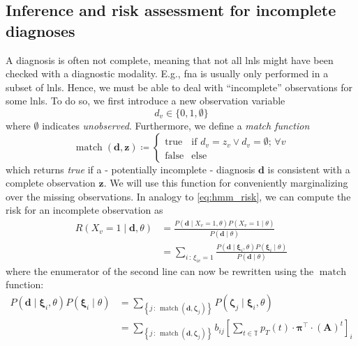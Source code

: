 \documentclass[../ms.tex]{subfiles}
\begin{document}
\subsection{Inference and risk assessment for incomplete diagnoses}
\label{subsec:hmm_incomplete_diag}

A diagnosis is often not complete, meaning that not all \glspl{lnl} might have been checked with a diagnostic modality. E.g., \gls{fna} is usually only performed in a subset of \glspl{lnl}. Hence, we must be able to deal with “incomplete” observations for some \glspl{lnl}. To do so, we first introduce a new observation variable
%
\begin{equation}
    d_v \in \{ 0, 1, \emptyset \}
\end{equation}
%
where $\emptyset$ indicates \emph{unobserved}. Furthermore, we define a \emph{match function}
%
\begin{equation}
    \operatorname{match}(\mathbf{d}, \mathbf{z}) \coloneqq 
    \begin{cases}
        \text{true} & \text{if} \,\, d_v = z_v \vee d_v = \emptyset ; \,\forall v \\
        \text{false} & \text{else}
    \end{cases}
\end{equation}
%
which returns \emph{true} if a - potentially incomplete - diagnosis $\mathbf{d}$ is consistent with a complete observation $\mathbf{z}$. We will use this function for conveniently marginalizing over the missing observations. In analogy to \cref{eq:hmm_risk}, we can compute the risk for an incomplete observation as
%
\begin{equation} \label{eq:hmm_marg_risk}
    \begin{aligned}
        R \left( X_v=1 \mid \mathbf{d}, \theta \right) 
        &= \frac{P \left( \mathbf{d} \mid X_v=1, \theta \right) P \left( X_v=1 \mid \theta \right)}{P \left( \mathbf{d} \mid \theta \right)} \\
        &= \sum_{i\,:\,\xi_{iv}=1}{\frac{P \left( \mathbf{d} \mid \boldsymbol{\xi}_i , \theta \right) P \left( \boldsymbol{\xi}_i \mid \theta \right)}{P \left( \mathbf{d} \mid \theta \right)}}
    \end{aligned}
\end{equation}
%
where the enumerator of the second line can now be rewritten using the $\operatorname{match}$ function:
%
\begin{equation}
    \begin{aligned}
        P \left( \mathbf{d} \mid \boldsymbol{\xi}_i , \theta \right) P \left( \boldsymbol{\xi}_i \mid \theta \right) 
        &= \sum_{\left\{ j \,:\, \operatorname{match}(\mathbf{d}, \boldsymbol{\zeta}_j) \right\}}{ P \left( \boldsymbol{\zeta}_j \mid \boldsymbol{\xi}_i , \theta \right)} \\
        &= \sum_{\left\{ j \,:\, \operatorname{match}(\mathbf{d}, \boldsymbol{\zeta}_j) \right\}}{b_{ij} \left[ \sum_{t \in \mathbb{T}}{p_T(t) \cdot \boldsymbol{\pi}^\top \cdot (\mathbf{A})^t} \right]_i}
    \end{aligned}
\end{equation}
\end{document}
